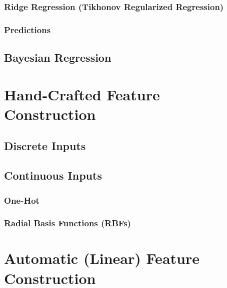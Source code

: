 			\subsubsection{Ridge Regression (Tikhonov Regularized Regression)} %

			\subsubsection{Predictions} %

		\subsection{Bayesian Regression} %

	\section{Hand-Crafted Feature Construction} %

		\subsection{Discrete Inputs} %

		\subsection{Continuous Inputs} %

			\subsubsection{One-Hot} %

			\subsubsection{Radial Basis Functions (RBFs)} %

	\section{Automatic (Linear) Feature Construction} %

